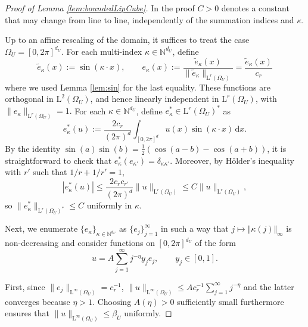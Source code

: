 \documentclass[10pt,a4paper]{amsart}
\def\Lp#1{\mathrm{L}^{#1}}
\newcommand{\bbN}{\mathbb{N}}
\def\dd{\mathrm{d}}
\begin{document}
\begin{proof}[Proof of Lemma \ref{lem:boundedLipCube}]
In the proof $C>0$ denotes a constant that may change from line to line, independently of the summation indices and $\kappa$.

Up to an affine rescaling of the domain, it suffices to treat the case
\(
\Omega_U=[0,2\pi]^{d_U}.
\)
For each multi-index $\kappa\in \mathbb N^{d_U}$, define
\[
\tilde e_\kappa(x) := \sin(\kappa\cdot x),
\qquad
e_\kappa(x):=\frac{\tilde e_\kappa(x)}{\|\tilde e_\kappa\|_{\Lp{r}(\Omega_U)}} = \frac{\tilde e_\kappa(x)}{c_r}
\]
where we used Lemma \ref{lem:sin} for the last equality. 
These functions are orthogonal in $\Lp{2}(\Omega_U)$, and hence linearly independent in $\Lp{r}(\Omega_U)$, with
\(
\|e_\kappa\|_{\Lp{r}(\Omega_U)} =1.
\)
For each $\kappa \in \bbN^{d_U}$, define $e^*_\kappa \in \Lp{r}(\Omega_U)^*$ as
\[
e_\kappa^*(u)
:=
\frac{2 c_r}{(2\pi)^d}\int_{[0,2\pi]^d} u(x)\sin(\kappa\cdot x)\, \dd x.
\]
By the identity $\sin(a)\sin(b) = \frac{1}{2}(\cos(a-b) - \cos(a+b))$, it is straightforward to check that $e_\kappa^*(e_{\kappa'})=\delta_{\kappa\kappa'}$. Moreover, by H\"older's inequality with $r'$ such that $1/r + 1/r' = 1$, 
\[
|e_\kappa^*(u)|
\le
\frac{2 c_r c_{r'}}{(2\pi)^d}
\|u\|_{\Lp{r}(\Omega_U)}
\le C \|u\|_{\Lp{r}(\Omega_U)},
\]
so
\(
\|e_\kappa^*\|_{\Lp{r}(\Omega_U)^*} \le C
\)
uniformly in $\kappa$.

Next, we enumerate $\{e_\kappa\}_{\kappa \in \bbN^{d_U}}$ as $\{e_j\}_{j=1}^\infty$ in such a way that $j\mapsto \Vert \kappa(j) \Vert_{\infty}$ is non-decreasing and consider functions on $[0,2\pi]^{d_U}$ of the form
\[
u = A \sum_{j=1}^\infty j^{-\eta} y_j e_j,
\qquad y_j\in [0,1].
\]


First, since $\|e_j\|_{\Lp{\infty}(\Omega_U)} = c_r^{-1}$,
\(
\|u\|_{\Lp{\infty}(\Omega_U)}
\le
Ac_r^{-1}\sum_{j=1}^\infty j^{-\eta}
\)
and the latter converges because $\eta>1$. Choosing $A(\eta)>0$ sufficiently small furthermore ensures that
\(
\|u\|_{\Lp{\infty}(\Omega_U)} \leq \beta_U
\)
uniformly. 


\end{proof}
\end{document}
